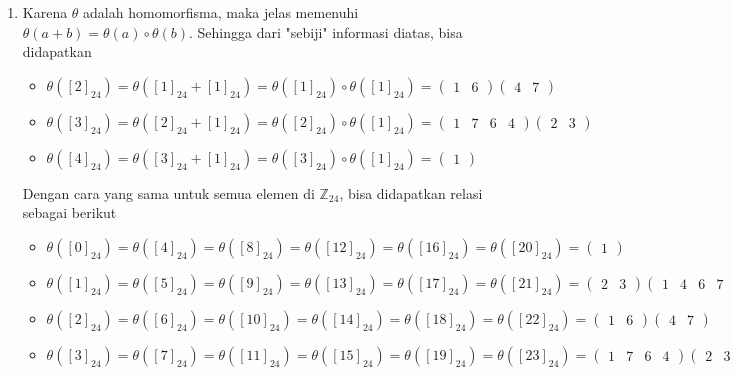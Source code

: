 \documentclass[10pt,openany,a4paper]{article}
\newcommand{\Z}{\mathbb{Z}}
\begin{document}
\begin{enumerate}
    \item Karena $\theta$ adalah homomorfisma, maka jelas memenuhi $\theta(a+b) = \theta(a)\circ\theta(b)$. Sehingga dari "sebiji" informasi diatas, bisa didapatkan
    \begin{itemize}
        \item $\theta([2]_{24})=\theta([1]_{24}+[1]_{24})=\theta([1]_{24})\circ\theta([1]_{24})=\begin{pmatrix}1&6\end{pmatrix}\begin{pmatrix}4&7\end{pmatrix}$
        \item $\theta([3]_{24})=\theta([2]_{24}+[1]_{24})=\theta([2]_{24})\circ\theta([1]_{24})=\begin{pmatrix}1&7&6&4\end{pmatrix}\begin{pmatrix}2&3\end{pmatrix}$
        \item $\theta([4]_{24})=\theta([3]_{24}+[1]_{24})=\theta([3]_{24})\circ\theta([1]_{24})=\begin{pmatrix}1\end{pmatrix}$
    \end{itemize}
    Dengan cara yang sama untuk semua elemen di $\Z_{24}$, bisa didapatkan relasi sebagai berikut
    \begin{itemize}
        \item $\theta([0]_{24})=\theta([4]_{24})=\theta([8]_{24})=\theta([12]_{24})=\theta([16]_{24})=\theta([20]_{24})=\begin{pmatrix}1\end{pmatrix}$
        \item $\theta([1]_{24})=\theta([5]_{24})=\theta([9]_{24})=\theta([13]_{24})=\theta([17]_{24})=\theta([21]_{24})=\begin{pmatrix}2&3\end{pmatrix}\begin{pmatrix}1&4&6&7\end{pmatrix}$
        \item $\theta([2]_{24})=\theta([6]_{24})=\theta([10]_{24})=\theta([14]_{24})=\theta([18]_{24})=\theta([22]_{24})=\begin{pmatrix}1&6\end{pmatrix}\begin{pmatrix}4&7\end{pmatrix}$
        \item $\theta([3]_{24})=\theta([7]_{24})=\theta([11]_{24})=\theta([15]_{24})=\theta([19]_{24})=\theta([23]_{24})=\begin{pmatrix}1&7&6&4\end{pmatrix}\begin{pmatrix}2&3\end{pmatrix}$

\end{itemize}
\end{enumerate}
\end{document}

